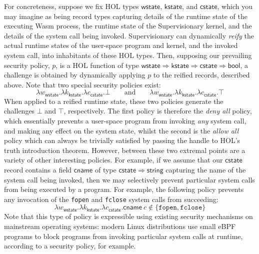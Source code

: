 \documentclass[a4paper, UKenglish, cleveref, autoref, thm-restate, colorlinks]{lipics-v2021}
\newcommand{\lam}[1]{\lambda{#1}.}
\begin{document}
For concreteness, suppose we fix HOL types $\mathsf{wstate}$, $\mathsf{kstate}$, and $\mathsf{cstate}$, which you may imagine as being record types capturing details of the runtime state of the executing Wasm process, the runtime state of the Supervisionary kernel, and the details of the system call being invoked.
Supervisionary can dynamically \emph{reify} the actual runtime states of the user-space program and kernel, and the invoked system call, into inhabitants of these HOL types.
Then, supposing our prevailing security policy, $p$, is a HOL function of type $\mathsf{wstate} \Rightarrow \mathsf{kstate} \Rightarrow \mathsf{cstate} \Rightarrow \mathsf{bool}$, a challenge is obtained by dynamically applying $p$ to the reified records, described above.
Note that two special security policies exist:
\begin{displaymath}
\lam{w_{\mathsf{wstate}}}\lam{k_{\mathsf{kstate}}}\lam{c_{\mathsf{cstate}}}\bot \qquad\text{and}\qquad \lam{w_{\mathsf{wstate}}}\lam{k_{\mathsf{kstate}}}\lam{c_{\mathsf{cstate}}}\top
\end{displaymath}
When applied to a reified runtime state, these two policies generate the challenges $\bot$ and $\top$, respectively.
The first policy is therefore the \emph{deny all} policy, which essentially prevents a user-space program from invoking \emph{any} system call, and making any effect on the system state, whilst the second is the \emph{allow all} policy which can always be trivially satisfied by passing the handle to HOL's truth introduction theorem.
However, between these two extremal points are a variety of other interesting policies.
For example, if we assume that our $\mathsf{cstate}$ record contains a field $\mathsf{cname}$ of type $\mathsf{cstate} \Rightarrow \mathsf{string}$ capturing the name of the system call being invoked, then we may selectively prevent particular system calls from being executed by a program.
For example, the following policy prevents any invocation of the \texttt{fopen} and \texttt{fclose} system calls from succeeding:
\begin{displaymath}
\lam{w_{\mathsf{wstate}}}\lam{k_{\mathsf{kstate}}}\lam{c_{\mathsf{cstate}}}\mathsf{cname}\ c \notin \{ \mathtt{fopen}, \mathtt{fclose} \}
\end{displaymath}
Note that this type of policy is expressible using existing security mechanisms on mainstream operating systems: modern Linux distributions use small eBPF programs to block programs from invoking particular system calls at runtime, according to a security policy, for example.
\end{document}

